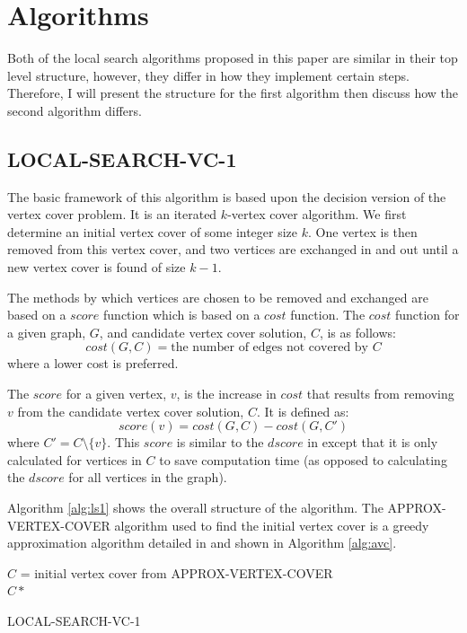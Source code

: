 \documentclass[sigconf]{acmart}
\begin{document}
\section{Algorithms}
Both of the local search algorithms proposed in this paper are similar in their top level structure, however, they differ in how they implement certain steps. Therefore, I will present the structure for the first algorithm then discuss how the second algorithm differs.
\subsection{LOCAL-SEARCH-VC-1}
The basic framework of this algorithm is based upon the decision version of the vertex cover problem. It is an iterated $k$-vertex cover algorithm. We first determine an initial vertex cover of some integer size $k$. One vertex is then removed from this vertex cover, and two vertices are exchanged in and out until a new vertex cover is found of size $k - 1$.

The methods by which vertices are chosen to be removed and exchanged are based on a $score$ function which is based on a $cost$ function. The $cost$ function for a given graph, $G$, and candidate vertex cover solution, $C$, is as follows:
\begin{equation*}
	cost(G,C) = \text{the number of edges not covered by $C$}
\end{equation*}
where a lower cost is preferred.

The $score$ for a given vertex, $v$, is the increase in $cost$ that results from removing $v$ from the candidate vertex cover solution, $C$. It is defined as:
\begin{equation*}
	score(v) = cost(G,C) - cost(G,C')
\end{equation*}
where $C' = C \setminus \{v\}$. This $score$ is similar to the $dscore$ in \cite{cai2013numvc} except that it is only calculated for vertices in $C$ to save computation time (as opposed to calculating the $dscore$ for all vertices in the graph).

Algorithm \ref{alg:ls1} shows the overall structure of the algorithm. The APPROX-VERTEX-COVER algorithm used to find the initial vertex cover is a greedy approximation algorithm detailed in \cite{intro_alg_2009} and shown in Algorithm \ref{alg:avc}.

\begin{algorithm}[h]
	\SetAlgoNoLine
	$C$ = initial vertex cover from APPROX-VERTEX-COVER\\
	\Return $C*$
	\caption{LOCAL-SEARCH-VC-1}
	\label{alg:ls1}
\end{algorithm}
\end{document}
